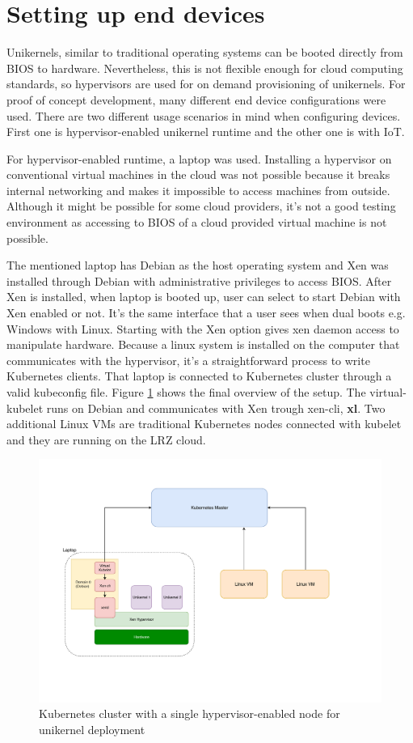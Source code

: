 \pagebreak
\section{Setting up end devices}
Unikernels, similar to traditional operating systems can be booted directly from BIOS to hardware. Nevertheless, this is not flexible enough for cloud computing standards, so hypervisors are used for on demand provisioning of unikernels. For proof of concept development, many different end device configurations were used. There are two different usage scenarios in mind when configuring devices. First one is hypervisor-enabled unikernel runtime and the other one is with IoT.

For hypervisor-enabled runtime, a laptop was used. Installing a hypervisor on conventional virtual machines in the cloud was not possible because it breaks internal networking and makes it impossible to access machines from outside. Although it might be possible for some cloud providers, it's not a good testing environment as accessing to BIOS of a cloud provided virtual machine is not possible.

The mentioned laptop has Debian as the host operating system and Xen was installed through Debian with administrative privileges to access BIOS. After Xen is installed, when laptop is booted up, user can select to start Debian with Xen enabled or not. It's the same interface that a user sees when dual boots e.g. Windows with Linux. Starting with the Xen option gives xen daemon access to manipulate hardware. Because a linux system is installed on the computer that communicates with the hypervisor, it's a straightforward process to write Kubernetes clients. That laptop is connected to Kubernetes cluster through a valid kubeconfig file. Figure \ref{fig:hypervisor} shows the final overview of the setup. The virtual-kubelet runs on Debian and communicates with Xen trough xen-cli, \textbf{xl}. Two additional Linux VMs are traditional Kubernetes nodes connected with kubelet and they are running on the LRZ cloud.

\begin{figure}[htpb]
  
  \centering
  \includegraphics[width=1.2\textwidth]{figures/arch_new.pdf}
  \caption{ Kubernetes cluster with a single hypervisor-enabled node for unikernel deployment} \label{fig:hypervisor}
\end{figure}


